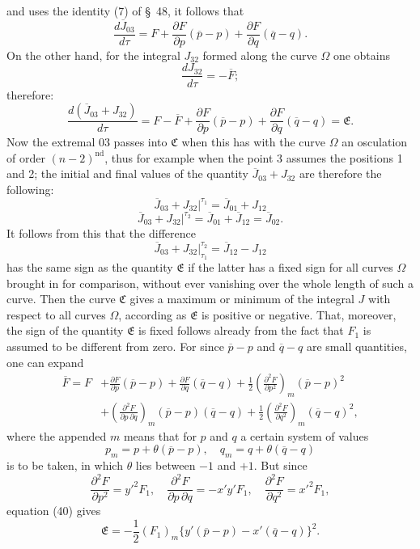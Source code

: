 \documentclass[11pt,a4paper,leqno]{article}
\begin{document}
and uses the identity (7) of \S~48, it follows that
\[
\frac{d\overline{J}_{03}}{d\tau}
=F+\frac{\partial F}{\partial p}(\overline{p}-p)
+\frac{\partial F}{\partial q}(\overline{q}-q).
\]
On the other hand, for the integral $J_{32}$ formed along the curve $\Omega$ one obtains
\[
\frac{dJ_{32}}{d\tau}=-\overline{F};
\]
therefore:
\begin{equation}\tag{40}
\frac{d(\overline{J}_{03}+J_{32})}{d\tau}
=F-\overline{F}+\frac{\partial F}{\partial p}(\overline{p}-p)
+\frac{\partial F}{\partial q}(\overline{q}-q)=\mathfrak{E}.
\end{equation}
Now the extremal 03 passes into $\mathfrak{C}$ when this has with the curve $\Omega$ an osculation of order $(n-2)^{\mathrm{nd}}$, thus for example when the point 3 assumes the positions 1 and 2; the initial and final values of the quantity $\overline{J}_{03}+J_{32}$ are therefore the following:
\[
\overline{J}_{03}+J_{32}\bigg|^{\tau_1}
=\overline{J}_{01}+J_{12}
\]
\[
\overline{J}_{03}+J_{32}\bigg|^{\tau_2}
=\overline{J}_{01}+\overline{J}_{12}=\overline{J}_{02}.
\]
It follows from this that the difference
\[
\overline{J}_{03}+J_{32}\bigg|_{\tau_1}^{\tau_2}=\overline{J}_{12}-J_{12}
\]
has the same sign as the quantity $\mathfrak{E}$ if the latter has a fixed sign for all curves $\Omega$ brought in for comparison, without ever vanishing over the whole length of such a curve. Then the curve $\mathfrak{C}$ gives a maximum or
minimum of the integral $J$ with respect to all curves $\Omega$, according as $\mathfrak{E}$ is positive or negative. That, moreover, the sign of the quantity $\mathfrak{E}$ is fixed follows already from the fact that $F_1$ is assumed to be different from zero. For since $\overline{p}-p$ and $\overline{q}-q$ are small quantities, one can expand
\[
\begin{aligned}
\overline{F}=F&+\frac{\partial F}{\partial p}(\overline{p}-p)
+\frac{\partial F}{\partial q}(\overline{q}-q)
+\frac12\left(\frac{\partial^2F}{\partial p^2}\right)_m(\overline{p}-p)^2\\
&+\left(\frac{\partial^2F}{\partial p\,\partial q}\right)_m
(\overline{p}-p)(\overline{q}-q)
+\frac12\left(\frac{\partial^2F}{\partial q^2}\right)_m(\overline{q}-q)^2,
\end{aligned}
\]
where the appended $m$ means that for $p$ and $q$ a certain system of values
\[
p_m=p+\theta(\overline{p}-p),\quad
q_m=q+\theta(\overline{q}-q)
\]
is to be taken, in which $\theta$ lies between $-1$ and $+1$. But since
\[
\frac{\partial^2F}{\partial p^2}=y'^2F_1,\quad
\frac{\partial^2F}{\partial p\,\partial q}=-x'y'F_1,\quad
\frac{\partial^2F}{\partial q^2}=x'^2F_1,
\]
equation (40) gives
\[
\mathfrak{E}=-\frac12(F_1)_m\{y'(\overline{p}-p)-x'(\overline{q}-q)\}^2.
\]
\end{document}
